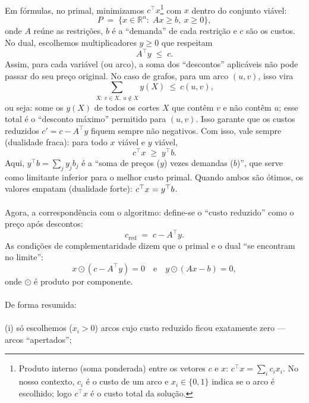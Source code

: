 \documentclass[12pt,a4paper]{article}
\begin{document}
\paragraph{}
Em fórmulas, no primal, minimizamos \(c^\top x\)\footnote{Produto interno (soma ponderada) entre os vetores \(c\) e \(x\): \(c^\top x=\sum_i c_i x_i\). No nosso contexto, \(c_i\) é o custo de um arco e \(x_i\in\{0,1\}\) indica se o arco é escolhido; logo \(c^\top x\) é o custo total da solução.} com \(x\) dentro do conjunto viável:
\[
    P\;=\;\{x\in\mathbb{R}^n:\; Ax\ge b,\ x\ge 0\},
\]
onde \(A\) reúne as restrições, \(b\) é a “demanda” de cada restrição e \(c\) são os custos. No dual, escolhemos multiplicadores \(y\ge 0\) que respeitam
\[
    A^\top y\;\le\; c.
\]
Assim, para cada variável (ou arco), a soma dos “descontos” aplicáveis não pode passar do seu preço original. No caso de grafos, para um arco \((u,v)\), isso vira
\[
    \sum_{X:\, v\in X,\ u\notin X} y(X)\ \le\ c(u,v),
\]
ou seja: some os \(y(X)\) de todos os cortes \(X\) que contêm \(v\) e não contêm \(u\); esse total é o “desconto máximo” permitido para \((u,v)\). Isso garante que os custos reduzidos \(c' = c - A^\top y\) fiquem sempre não negativos.
Com isso, vale sempre (dualidade fraca): para todo \(x\) viável e \(y\) viável,
\[
    c^\top x\;\ge\; y^\top b.
\]
Aqui, \(y^\top b=\sum_j y_j b_j\) é a “soma de preços (\(y\)) vezes demandas (\(b\))”, que serve como limitante inferior para o melhor custo primal.
Quando ambos são ótimos, os valores empatam (dualidade forte): \(c^\top x^{\*}=y^{\*\top} b\).

\paragraph{}
Agora, a correspondência com o algoritmo: define-se o “custo reduzido” como o preço após descontos:
\[
    c_{\text{red}}\;=\;c - A^\top y.
\]
As condições de complementaridade dizem que o primal e o dual “se encontram no limite”:
\[
    x\odot(c - A^\top y)=0\quad\text{e}\quad y\odot(Ax-b)=0,
\]
onde \(\odot\) é produto por componente.

\paragraph{}
De forma resumida:
\paragraph{}
(i) só escolhemos (\(x_i>0\)) arcos cujo custo reduzido ficou exatamente zero — arcos “apertados”;
\end{document}
